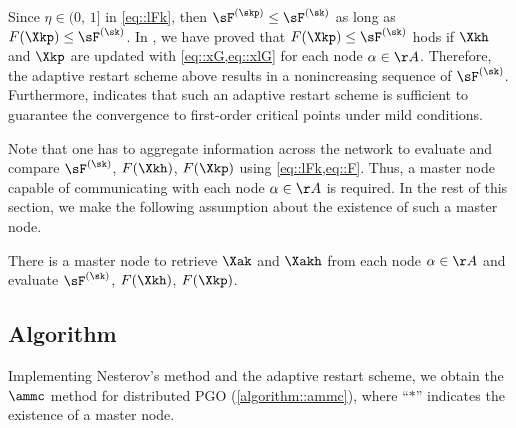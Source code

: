 \begin{remark}
Since $\eta\in(0,\,1]$ in \cref{eq::lFk}, then $\sF^{(\skp)}\leq \sF^{(\sk)}$ as long as $F(\Xkp)\leq \sF^{(\sk)}$.  In , we have proved that $F(\Xkp)\leq \sF^{(\sk)}$ hods if  $\Xkh$ and $\Xkp$ are updated with  \cref{eq::xG,eq::xlG} for each node $\alpha\in\AA$. Therefore,  the adaptive restart scheme above results in a nonincreasing sequence of $\sF^{(\sk)}$.  Furthermore,   indicates that such an adaptive restart scheme is sufficient to guarantee the convergence to first-order critical points under mild conditions.
\end{remark}


Note that one has to aggregate information across the network to evaluate and compare $\sF^{(\sk)}$, $F(\Xkh)$, $F(\Xkp)$ using \cref{eq::lFk,eq::F}. Thus, a master node capable of communicating with each node $\alpha\in\AA$ is required. In the rest of this section, we make the following assumption about the existence of such a master node.

\begin{assumption}\label{assumption::master}
	There is a master node to retrieve $\Xak$ and $\Xakh$ from each node $\alpha\in\AA$ and evaluate $\sF^{(\sk)}$, $F(\Xkh)$, $F(\Xkp)$.  
\end{assumption}

\subsection{Algorithm}\label{section::ammc::algorithm}



Implementing Nesterov's method  and the adaptive restart scheme, we obtain the $\ammc$ method for distributed PGO (\cref{algorithm::ammc}), where ``$*$'' indicates  the existence of a master node. 

